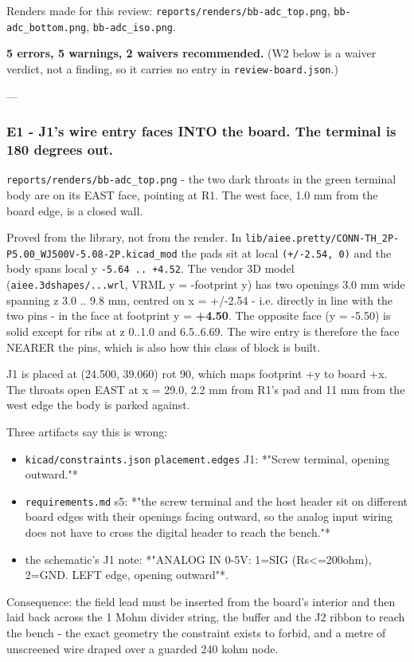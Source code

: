 \documentclass[11pt,a4paper]{article}
\begin{document}
Renders made for this review: \texttt{reports/renders/bb-adc\_top.png}, \texttt{bb-adc\_bottom.png}, \texttt{bb-adc\_iso.png}.

\textbf{5 errors, 5 warnings, 2 waivers recommended.} (W2 below is a waiver verdict, not a finding, so it carries no entry in \texttt{review-board.json}.)

---

\subsubsection*{E1 - J1's wire entry faces INTO the board. The terminal is 180 degrees out.}
\texttt{reports/renders/bb-adc\_top.png} - the two dark throats in the green terminal body are on its EAST face, pointing at R1. The west face, 1.0 mm from the board edge, is a closed wall.

Proved from the library, not from the render. In \texttt{lib/aiee.pretty/CONN-TH\_2P-P5.00\_WJ500V-5.08-2P.kicad\_mod} the pads sit at local \texttt{(+/-2.54, 0)} and the body spans local y \texttt{-5.64 .. +4.52}. The vendor 3D model (\texttt{aiee.3dshapes/...wrl}, VRML y = -footprint y) has two openings 3.0 mm wide spanning z 3.0 .. 9.8 mm, centred on x = +/-2.54 - i.e. directly in line with the two pins - in the face at footprint y = \textbf{+4.50}. The opposite face (y = -5.50) is solid except for ribs at z 0..1.0 and 6.5..6.69. The wire entry is therefore the face NEARER the pins, which is also how this class of block is built.

J1 is placed at (24.500, 39.060) rot 90, which maps footprint +y to board +x. The throats open EAST at x = 29.0, 2.2 mm from R1's pad and 11 mm from the west edge the body is parked against.

Three artifacts say this is wrong:

\begin{itemize}
\item \texttt{kicad/constraints.json} \texttt{placement.edges} J1: {*}"Screw terminal, opening
outward."{*}
\item \texttt{requirements.md} s5: {*}"the screw terminal and the host header sit on
different board edges with their openings facing outward, so the analog input
wiring does not have to cross the digital header to reach the bench."{*}
\item the schematic's J1 note: {*}"ANALOG IN 0-5V: 1=SIG (Rs\textless{}=200ohm), 2=GND. LEFT
edge, opening outward"{*}.
\end{itemize}
Consequence: the field lead must be inserted from the board's interior and then laid back across the 1 Mohm divider string, the buffer and the J2 ribbon to reach the bench - the exact geometry the constraint exists to forbid, and a metre of unscreened wire draped over a guarded 240 kohm node.
\end{document}

